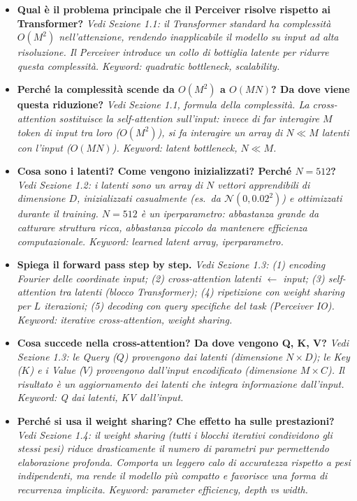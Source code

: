 \documentclass[
  11pt,
]{article}
\begin{document}
\begin{itemize}

  \item \textbf{Qual è il problema principale che il Perceiver risolve rispetto ai Transformer?}
  \textit{Vedi Sezione 1.1: il Transformer standard ha complessità $O(M^2)$ nell'attenzione, rendendo inapplicabile il modello su input ad alta risoluzione. Il Perceiver introduce un collo di bottiglia latente per ridurre questa complessità. Keyword: quadratic bottleneck, scalability.}

  \item \textbf{Perché la complessità scende da $O(M^2)$ a $O(MN)$? Da dove viene questa riduzione?}
  \textit{Vedi Sezione 1.1, formula della complessità. La cross-attention sostituisce la self-attention sull'input: invece di far interagire $M$ token di input tra loro ($O(M^2)$), si fa interagire un array di $N \ll M$ latenti con l'input ($O(MN)$). Keyword: latent bottleneck, $N \ll M$.}

  \item \textbf{Cosa sono i latenti? Come vengono inizializzati? Perché $N=512$?}
  \textit{Vedi Sezione 1.2: i latenti sono un array di $N$ vettori apprendibili di dimensione $D$, inizializzati casualmente (es.\ da $\mathcal{N}(0,0.02^2)$) e ottimizzati durante il training. $N=512$ è un iperparametro: abbastanza grande da catturare struttura ricca, abbastanza piccolo da mantenere efficienza computazionale. Keyword: learned latent array, iperparametro.}

  \item \textbf{Spiega il forward pass step by step.}
  \textit{Vedi Sezione 1.3: (1) encoding Fourier delle coordinate input; (2) cross-attention latenti $\leftarrow$ input; (3) self-attention tra latenti (blocco Transformer); (4) ripetizione con weight sharing per $L$ iterazioni; (5) decoding con query specifiche del task (Perceiver IO). Keyword: iterative cross-attention, weight sharing.}

  \item \textbf{Cosa succede nella cross-attention? Da dove vengono Q, K, V?}
  \textit{Vedi Sezione 1.3: le Query ($Q$) provengono dai latenti (dimensione $N \times D$); le Key ($K$) e i Value ($V$) provengono dall'input encodificato (dimensione $M \times C$). Il risultato è un aggiornamento dei latenti che integra informazione dall'input. Keyword: Q dai latenti, KV dall'input.}

  \item \textbf{Perché si usa il weight sharing? Che effetto ha sulle prestazioni?}
  \textit{Vedi Sezione 1.4: il weight sharing (tutti i blocchi iterativi condividono gli stessi pesi) riduce drasticamente il numero di parametri pur permettendo elaborazione profonda. Comporta un leggero calo di accuratezza rispetto a pesi indipendenti, ma rende il modello più compatto e favorisce una forma di recurrenza implicita. Keyword: parameter efficiency, depth vs width.}


\end{itemize}
\end{document}
